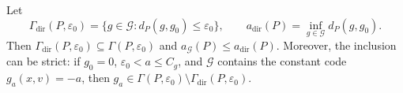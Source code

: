 Let
\[
 \Gamma_{\mathrm{dir}}(P,\varepsilon_0)
 =\{g\in\mathcal G:d_P(g,g_0)\le\varepsilon_0\},
 \qquad
 a_{\mathrm{dir}}(P)=\inf_{g\in\mathcal G}d_P(g,g_0).
\]
Then \(\Gamma_{\mathrm{dir}}(P,\varepsilon_0)\subseteq\Gamma(P,\varepsilon_0)\) and \(a_{\mathcal G}(P)\le a_{\mathrm{dir}}(P)\). Moreover, the inclusion can be strict: if \(g_0=0\), \(\varepsilon_0<a\le C_g\), and \(\mathcal G\) contains the constant code \(g_a(x,v)=-a\), then \(g_a\in\Gamma(P,\varepsilon_0)\setminus\Gamma_{\mathrm{dir}}(P,\varepsilon_0)\).